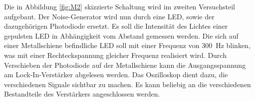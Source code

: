 Die in Abbildung \ref{fig:M2} skizzierte Schaltung wird im zweiten Versuchsteil aufgebaut. 
Der Noise-Generator wird nun durch eine LED, sowie der dazugehörigen Photodiode ersetzt. 
Es soll die Intensität des Lichtes einer gepulsten LED in Abhängigkeit vom Abstand gemessen werden.
Die sich auf einer Metallschiene befindliche LED soll mit einer Frequenz von \SI{300}{\hertz} blinken, was mit einer Rechteckspannung gleicher Frequenz realisiert wird. 
Durch Verschieben der Photodiode auf der Metallschiene kann die Ausgangsspannung am Lock-In-Verstärker abgelesen werden.
Das Oszilloskop dient dazu, die verschiedenen Signale sichtbar zu machen. 
Es kann beliebig an die verschiedenen Bestandteile des Verstärkers angeschlossen werden. 
